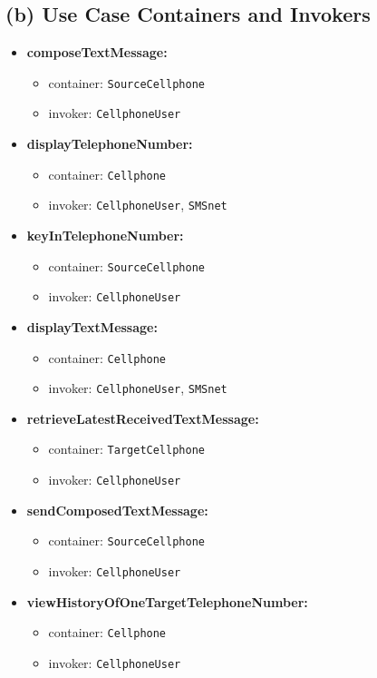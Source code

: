 \documentclass{article}
\begin{document}
\subsection*{(b) Use Case Containers and Invokers}

\begin{itemize}
    \item \textbf{composeTextMessage:}
    \begin{itemize}
        \item container: \texttt{SourceCellphone}
        \item invoker: \texttt{CellphoneUser}
    \end{itemize}
    \item \textbf{displayTelephoneNumber:}
    \begin{itemize}
        \item container: \texttt{Cellphone}
        \item invoker: \texttt{CellphoneUser}, \texttt{SMSnet}
    \end{itemize}
    \item \textbf{keyInTelephoneNumber:}
    \begin{itemize}
        \item container: \texttt{SourceCellphone}
        \item invoker: \texttt{CellphoneUser}
    \end{itemize}
    \item \textbf{displayTextMessage:}
    \begin{itemize}
        \item container: \texttt{Cellphone}
        \item invoker: \texttt{CellphoneUser}, \texttt{SMSnet}
    \end{itemize}
    \item \textbf{retrieveLatestReceivedTextMessage:}
    \begin{itemize}
        \item container: \texttt{TargetCellphone}
        \item invoker: \texttt{CellphoneUser}
    \end{itemize}
    \item \textbf{sendComposedTextMessage:}
    \begin{itemize}
        \item container: \texttt{SourceCellphone}
        \item invoker: \texttt{CellphoneUser}
    \end{itemize}
    \item \textbf{viewHistoryOfOneTargetTelephoneNumber:}
    \begin{itemize}
        \item container: \texttt{Cellphone}
        \item invoker: \texttt{CellphoneUser}
    \end{itemize}
\end{itemize}
\end{document}
